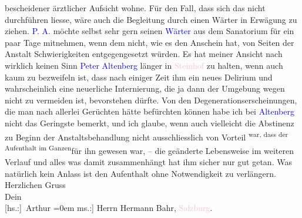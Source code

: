                bescheidener ärztlicher Aufsicht wohne. Für den Fall, dass sich das nicht durchführen
               liesse, wäre auch die Begleitung durch einen Wärter in Erwägung zu ziehen. \textcolor{blue}{P. A.}{}\ledrightnote{\textcolor{blue}{Peter Altenberg}} möchte selbst sehr gern seinen \textcolor{blue}{Wärter}{} aus dem Sanatorium für
               ein paar Tage mitnehmen, wenn dem nicht, wie es den Anschein hat, von Seiten der
               Anstalt Schwierigkei{\pb}ten entgegengesetzt würden. Es hat meiner Ansicht nach wirklich keinen Sinn \textcolor{blue}{Peter Altenberg}{}\ledrightnote{\textcolor{blue}{Peter Altenberg}} länger in \textcolor{pink}{Steinhof}{}\ledrightnote{\textcolor{pink}{Otto-Wagner-Spital}} zu halten, wenn auch kaum zu bezweifeln ist, dass nach
               einiger Zeit ihm ein neues Delirium und wahrscheinlich eine neuerliche Internierung,
               die ja dann der Umgebung wegen nicht zu vermeiden ist, bevorstehen dürfte. Von den
               Degenerationserscheinungen, die man nach allerlei Gerüchten hätte befürchten können
               habe ich bei \textcolor{blue}{Altenberg}{}\ledrightnote{\textcolor{blue}{Peter Altenberg}} nicht das Geringste
               bemerkt, und ich glaube, wenn auch vielleicht die \label{T_L02129_1v}\label{T_L02129_1h} Abstinenz zu
               Beginn der Anstaltsbehandlung nicht ausschliesslich von Vorteil \substVorne{}\textsuperscript{war, dass der Aufenthalt im Ganzen}{\allowbreak}\substDazwischen{}für ihn gewesen war\substHinten{}, – die geänderte Lebensweise im weiteren Verlauf und alles was damit
               zusammenhängt hat ihm sicher nur gut getan. Was natürlich kein Anlass ist den
               Aufenthalt ohne Notwendigkeit zu verlängern.\pend
           \pstart
           Herzlichen Gruss{\\[\baselineskip]}Dein{\\[\baselineskip]}\spacefill\mbox{{[}hs.:{]} Arthur}\pend
           \leftskip=0em{}\pstart
           \noindent{}{[}ms.:{]} Herrn Hermann Bahr, \textcolor{pink}{Salzburg}{}\ledrightnote{\textcolor{pink}{Salzburg}}.\pend
           \endnumbering{}  
      